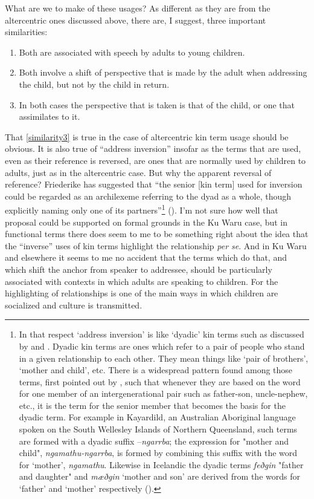 \documentclass[output=paper]{langsci/langscibook}
\begin{document}
What are we to make of these usages? As different as they are from the altercentric ones discussed above, there are, I suggest, three important similarities:

\begin{enumerate}
	\item Both are associated with speech by adults to young children.
	\item Both involve a shift of perspective that is made by the adult when addressing the child, but not by the child in return.
	\item In both cases the perspective that is taken is that of the child, or one that assimilates to it.\label{similarity3}
\end{enumerate}

That \ref{similarity3} is true in the case of altercentric kin term usage should be obvious. It is also true of “address inversion” insofar as the terms that are used, even as their reference is reversed, are ones that are normally used by children to adults, just as in the altercentric case. But why the apparent reversal of reference?  Friederike \citet{Braun1988} has suggested that “the senior [kin term] used for inversion could be regarded as an archilexeme referring to the dyad as a whole, though explicitly naming only one of its partners”\footnote{In that respect ‘address inversion’ is like ‘dyadic’ kin terms such as discussed by \cite{MerlanJeffrey1982} and \cite{Evans2006a}. Dyadic kin terms are ones which refer to a pair of people who stand in a given relationship to each other. They mean things like ‘pair of brothers’, ‘mother and child’, etc.  There is a widespread pattern found among those terms, first pointed out by \cite{MerlanJeffrey1982}, such that whenever they are based on the word for one member of an intergenerational pair such as father-son, uncle-nephew, etc., it is the term for the senior member that becomes the basis for the dyadic term. For example in Kayardild, an Australian Aboriginal language spoken on the South Wellesley Islands of Northern Queensland, such terms are formed with a dyadic suffix –\textit{ngarrba}; the expression for "mother and child", \textit{ngamathu-ngarrba}, is formed by combining this suffix with the word for ‘mother’, \textit{ngamathu}. Likewise in Icelandic the dyadic terms \textit{feðgin} "father and daughter" and \textit{mæðgin} ‘mother and son’ are derived from the words for ‘father’ and ‘mother’ respectively (\citealt{Evans2006a}).} (\citealt[285]{Braun1988}). I’m not sure how well that proposal could be supported on formal grounds in the Ku Waru case, but in functional terms there does seem to me to be something right about the idea that the “inverse” uses of kin terms highlight the relationship \textit{per se}. And in Ku Waru and elsewhere it seems to me no accident that the terms which do that, and which shift the anchor from speaker to addressee, should be particularly associated with contexts in which adults are speaking to children. For the highlighting of relationships is one of the main ways in which children are socialized and culture is transmitted.
\end{document}

